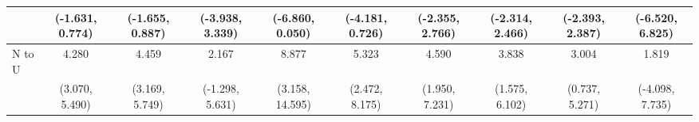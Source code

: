 {\begin{tabular}{l|c|c|c|c|c|c|c|c|c}
& {\scriptsize (-1.631, 0.774)}
& {\scriptsize (-1.655, 0.887)}
& {\scriptsize (-3.938, 3.339)}
& {\scriptsize (-6.860, 0.050)}
& {\scriptsize (-4.181, 0.726)}
& {\scriptsize (-2.355, 2.766)}
& {\scriptsize (-2.314, 2.466)}
& {\scriptsize (-2.393, 2.387)}
& {\scriptsize (-6.520, 6.825)}
\\ [0.1cm]
\hline
N to U
& 4.280 & 4.459 & 2.167 & 8.877 & 5.323 & 4.590 & 3.838 & 3.004 & 1.819 \\
& {\scriptsize (3.070, 5.490)}
& {\scriptsize (3.169, 5.749)}
& {\scriptsize (-1.298, 5.631)}
& {\scriptsize (3.158, 14.595)}
& {\scriptsize (2.472, 8.175)}
& {\scriptsize (1.950, 7.231)}
& {\scriptsize (1.575, 6.102)}
& {\scriptsize (0.737, 5.271)}
& {\scriptsize (-4.098, 7.735)}
\\ [0.1cm]
\hline
\hline
\end{tabular}
}
